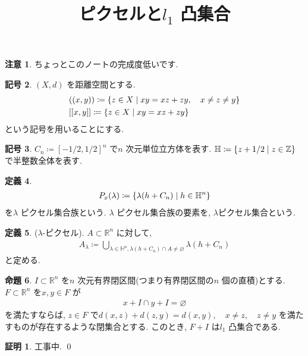 \documentclass[10pt, fleqn, label-section=none]{bxjsarticle}
\title{ピクセルと$l_1$ 凸集合}
\date{}
\author{}
\theoremstyle{definition}
\newtheorem{dfn}{定義}[section]
\newtheorem{prop}[dfn]{命題}
\newtheorem{notation}[dfn]{記号}
\newtheorem*{pf*}{証明}
\newtheorem{remark}[dfn]{注意}
\newcommand{\cbra}[1]{\mleft\{#1\mright\}}
\renewcommand{\;}{\, ; \,}
\begin{document}
\maketitle

\section{}

\begin{remark}ちょっとこのノートの完成度低いです. 

\end{remark}


\begin{notation}$(X, d)$ を距離空間とする. 
\begin{align*} &((x, y)) \coloneqq \cbra{z \in X \mid xy = xz + zy, \quad x \neq z \neq y} \\& [[x, y]] \coloneqq \cbra{z \in X \mid xy = xz + zy}\end{align*}
という記号を用いることにする. 
\end{notation}


\begin{notation}$C_n \coloneqq [-1/2, 1/2]^n$ で$n$ 次元単位立方体を表す. $\mathbb H \coloneqq \cbra{z + 1/2 \mid z \in \mathbb Z}$ で半整数全体を表す. 

\end{notation}

\begin{dfn}
\begin{align*} P_x(\lambda) \coloneqq \cbra{\lambda(h + C_n) \mid h \in \mathbb H^n} \end{align*}
を$\lambda$ ピクセル集合族という. $\lambda$ ピクセル集合族の要素を, $\lambda$ピクセル集合という. 
\end{dfn}

\begin{dfn}($\lambda$-ピクセル). $A \subset \mathbb R^n$ に対して, 
\begin{align*} A_{\lambda } \coloneqq \bigcup_{\lambda \in \mathbb H ^n , \lambda(h + C_n) \cap A \neq \varnothing} \lambda(h + C_n)\end{align*}
と定める. 
\end{dfn}

\begin{prop}$I \subset \mathbb R^n$ を$n$ 次元有界閉区間(つまり有界閉区間の$n$ 個の直積)とする. $F \subset \mathbb R^n $ を$x, y \in F$ が
\begin{align*} x + I \cap y + I = \varnothing  \end{align*}
を満たすならば, $z \in F$ で$d(x, z) + d(z, y) = d(x, y), \quad x \neq z, \quad z \neq y$  を満たすものが存在するような閉集合とする. このとき, $F + I$ は$l_1$ 凸集合である. 
\end{prop}
\begin{pf*}
工事中. 
\qed
\end{pf*}
\end{document}
